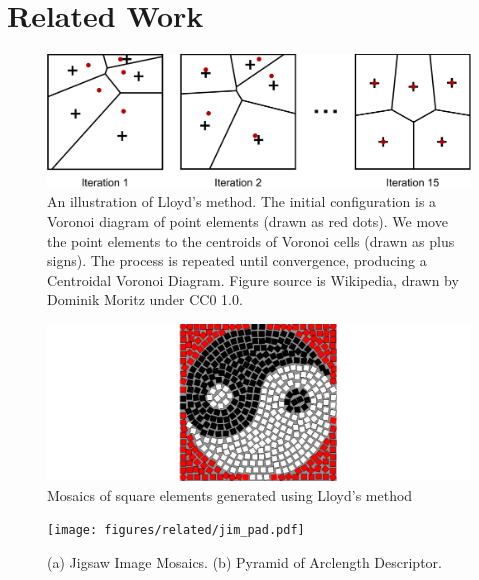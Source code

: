 
\chapter{Related Work}
\label{chapter_related_work}

\begin{figure}
\centering
\includegraphics[width=1.0\textwidth]{figures/related/lloyds_method.pdf} 
\caption[An illustration of Lloyd's Method.]
{\label{fig_lloyds_method} 
An illustration of Lloyd's method.
The initial configuration is a Voronoi diagram of point elements (drawn as red dots).
We move the point elements to the centroids of Voronoi cells (drawn as plus signs).
The process is repeated until convergence, producing a Centroidal Voronoi Diagram.
Figure source is Wikipedia, drawn by Dominik Moritz under CC0 1.0.
}
\end{figure}


\begin{figure}
\centering
\includegraphics[width=1.0\textwidth]{figures/related/hausner.pdf} 
\caption[Decorative mosaics using Lloyd's method]
{\label{fig_related_hausner} 
Mosaics of square elements generated using Lloyd's method~\cite{Hausner2001}}
\end{figure}


\begin{figure}
\centering
\texttt{[image: figures/related/jim\_pad.pdf]} 
\caption[Examples of packings generated by JIM and PAD]
{\label{fig_related_jim_pad} 
(a) Jigsaw Image Mosaics.
(b) Pyramid of Arclength Descriptor. }
\end{figure}


